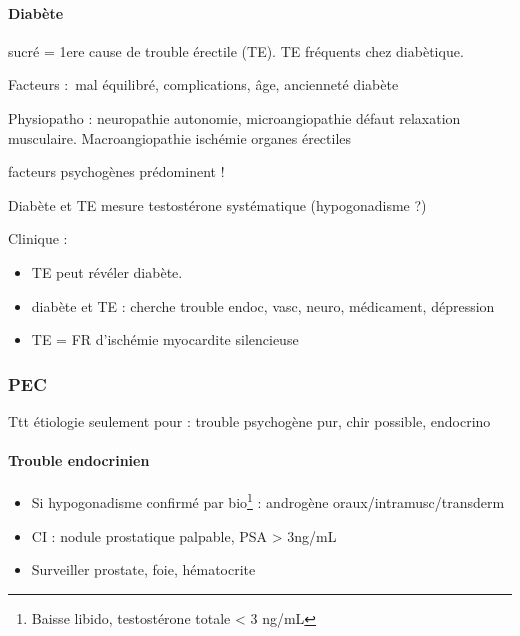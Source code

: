 \documentclass[11pt]{article}
\begin{document}
\paragraph{Diabète}
\label{sec:org297c426}
sucré = 1ere cause de trouble érectile (TE). TE fréquents chez diabètique. 

Facteurs : mal équilibré, complications, âge, ancienneté diabète

Physiopatho : neuropathie autonomie, microangiopathie \thus défaut relaxation
musculaire. Macroangiopathie \thus ischémie organes érectiles

\danger facteurs psychogènes prédominent !

Diabète et TE \thus mesure testostérone systématique (hypogonadisme ?)

Clinique : 
\begin{itemize}
\item TE peut révéler diabète.
\item diabète et TE : cherche trouble endoc, vasc, neuro, médicament, dépression
\item TE = FR d'ischémie myocardite silencieuse \danger
\end{itemize}

\subsubsection{PEC}
\label{sec:orgb0b8103}
Ttt étiologie seulement pour : trouble psychogène pur, chir possible, endocrino

\paragraph{Trouble endocrinien}
\label{sec:org6817872}
\begin{itemize}
\item Si hypogonadisme confirmé par bio\footnote{Baisse libido, testostérone totale < 3 ng/mL} : androgène oraux/intramusc/transderm
\item CI : nodule prostatique palpable, PSA > 3ng/mL
\item Surveiller prostate, foie, hématocrite
\end{itemize}
\end{document}
